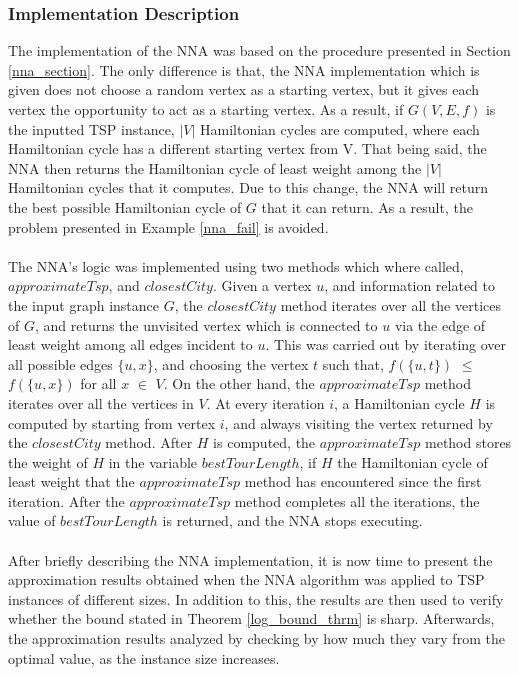\documentclass{article}
\begin{document}
\subsubsection{Implementation Description}
\label{NNA_impl}
The implementation of the NNA was based on the procedure presented in Section \ref{nna_section}. The only difference is that, the NNA implementation which is given does not choose a random vertex as a starting vertex, but it gives each vertex the opportunity to act as a starting vertex. As a result, if $G(V,E,f)$ is the inputted TSP instance, $|V|$ Hamiltonian cycles are computed, where each Hamiltonian cycle has a different starting vertex from V. That being said, the NNA then returns the Hamiltonian cycle of least weight among the $|V|$ Hamiltonian cycles that it computes. Due to this change, the NNA will return the best possible Hamiltonian cycle of $G$ that it can return. As a result, the problem presented in Example \ref{nna_fail} is avoided.\\\\
The NNA's logic was implemented using two methods which where called, $approximateTsp$, and $closestCity$. Given a vertex $u$, and information related to the input graph instance $G$, the $closestCity$ method iterates over all the vertices of $G$, and returns the unvisited vertex which is connected to $u$ via the edge of least weight among all edges incident to $u$. This was carried out by iterating over all possible edges $\{u,x\}$, and choosing the vertex $t$ such that, $f(\{u,t\})$ $\leq$ $f(\{u,x\})$ for all $x$ $\in$ $V$. On the other hand, the $approximateTsp$ method iterates over all the vertices in $V$. At every iteration $i$, a Hamiltonian cycle $H$ is computed by starting from vertex $i$, and always visiting the vertex returned by the $closestCity$ method. After $H$ is computed, the $approximateTsp$ method stores the weight of $H$ in the variable $bestTourLength$, if $H$ the Hamiltonian cycle of least weight that the $approximateTsp$ method has encountered since the first iteration. After the $approximateTsp$ method completes all the iterations, the value of $bestTourLength$ is returned, and the NNA stops executing.\\\\
After briefly describing the NNA implementation, it is now time to present the approximation results obtained when the NNA algorithm was applied to TSP instances of different sizes. In addition to this, the results are then used to verify whether the bound stated in Theorem \ref{log_bound_thrm} is sharp. Afterwards, the approximation results analyzed by checking by how much they vary from the optimal value, as the instance size increases.
\end{document}
